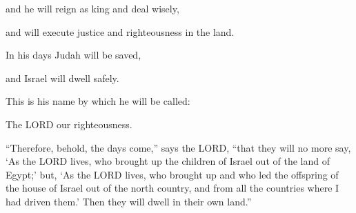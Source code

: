 and he will reign as king and deal wisely,

and will execute justice and righteousness in the land.


\myverse{}In his days Judah will be saved,

and Israel will dwell safely.

This is his name by which he will be called:

The LORD our righteousness.


\myverse{}“Therefore, behold, the days come,” says the LORD, “that they will no more say, ‘As the LORD lives, who brought up the children of Israel out of the land of Egypt;’ \myverse{}but, ‘As the LORD lives, who brought up and who led the offspring of the house of Israel out of the north country, and from all the countries where I had driven them.’ Then they will dwell in their own land.”


